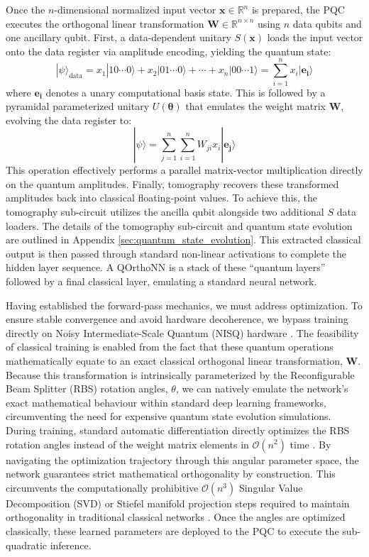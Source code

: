 \documentclass{iopjournal}
\begin{document}
Once the $n$-dimensional normalized input vector $\mathbf{x} \in \mathbb{R}^n$ is prepared, the PQC executes the orthogonal linear transformation $\mathbf{W} \in \mathbb{R}^{n \times n}$ using $n$ data qubits and one ancillary qubit. First, a data-dependent unitary $S(\mathbf{x})$ loads the input vector onto the data register via amplitude encoding, yielding the quantum state:
\[
|\psi\rangle_\mathrm{data} = x_1 |10\cdots0\rangle + x_2 |01\cdots0\rangle + \cdots + x_n |00\cdots1\rangle = \sum_{i=1}^{n} x_i |\mathbf{e_i}\rangle
\]
where $\mathbf{e_i}$ denotes a unary computational basis state. This is followed by a pyramidal parameterized unitary $U(\boldsymbol{\theta})$ that emulates the weight matrix $\mathbf{W}$, evolving the data register to:
\[
|\psi\rangle = \sum_{j=1}^{n}\sum_{i=1}^{n}W_{ji}x_i|\mathbf{e_j}\rangle
\]
This operation effectively performs a parallel matrix-vector multiplication directly on the quantum amplitudes. Finally, tomography recovers these transformed amplitudes back into classical floating-point values. To achieve this, the tomography sub-circuit utilizes the ancilla qubit alongside two additional $S$ data loaders. The details of the tomography sub-circuit and quantum state evolution are outlined in Appendix \ref{sec:quantum_state_evolution}. This extracted classical output is then passed through standard non-linear activations to complete the hidden layer sequence. A QOrthoNN is a stack of these ``quantum layers'' followed by a final classical layer, emulating a standard neural network.

Having established the forward-pass mechanics, we must address optimization. To ensure stable convergence and avoid hardware decoherence, we bypass training directly on Noisy Intermediate-Scale Quantum (NISQ) hardware \cite{bharti2022nisq, preskill2018nisq}. The feasibility of classical training is enabled from the fact that these quantum operations mathematically equate to an exact classical orthogonal linear transformation, $\mathbf{W}$. Because this transformation is intrinsically parameterized by the Reconfigurable Beam Splitter (RBS) rotation angles, $\theta$, we can natively emulate the network's exact mathematical behaviour within standard deep learning frameworks, circumventing the need for expensive quantum state evolution simulations. During training, standard automatic differentiation directly optimizes the RBS rotation angles instead of the weight matrix elements in $\mathcal{O}(n^2)$ time \cite{kerenidis2022qorthonn, landman2022medicalqorthonn}. By navigating the optimization trajectory through this angular parameter space, the network guarantees strict mathematical orthogonality by construction. This circumvents the computationally prohibitive $\mathcal{O}(n^{3})$ Singular Value Decomposition (SVD) or Stiefel manifold projection steps required to maintain orthogonality in traditional classical networks \cite{kerenidis2022qorthonn, landman2022medicalqorthonn, jia2019orthogodnn}. Once the angles are optimized classically, these learned parameters are deployed to the PQC to execute the sub-quadratic inference.
\end{document}
